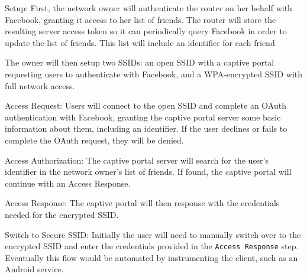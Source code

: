 \begin{description}
\item{Setup:} First, the network owner will authenticate the router on her behalf with Facebook,
granting it access to her list of friends. The router will store the resulting server access token
so it can periodically query Facebook in order to update the list of friends. This list will include
an identifier for each friend.

The owner will then setup two SSIDs: an open SSID with a captive portal requesting users to
authenticate with Facebook, and a WPA-encrypted SSID with full network access.

\item{Access Request:} Users will connect to the open SSID and complete an OAuth authentication with
Facebook, granting the captive portal server some basic information about them, including an
identifier. If the user declines or fails to complete the OAuth request, they will be denied.

\item{Access Authorization:} The captive portal server will search for the user's identifier in the
network owner's list of friends. If found, the captive portal will continue with an Access Response.

\item{Access Response:} The captive portal will then response with the credentials needed for the
encrypted SSID.

\item{Switch to Secure SSID:} Initially the user will need to manually switch over to the encrypted
SSID and enter the credentials provided in the \texttt{Access Response} step. Eventually this flow
would be automated by instrumenting the client, such as an Android service.
\end{description}